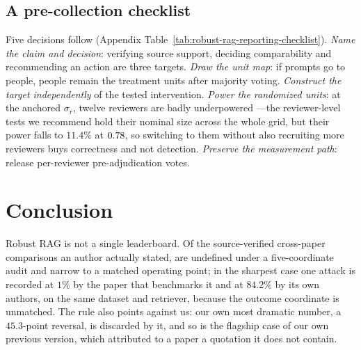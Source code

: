 \documentclass[11pt]{article}
\begin{document}
\subsection{A pre-collection checklist}
\label{sec:practical-audit}

Five decisions follow (Appendix
Table~\ref{tab:robust-rag-reporting-checklist}). \emph{Name the claim and
decision}: verifying source support, deciding comparability and recommending an
action are three targets. \emph{Draw the unit map}: if prompts go to people,
people remain the treatment units after majority voting.
\emph{Construct the target independently} of the tested intervention.
\emph{Power the randomized units}: at the anchored $\sigma_r$, twelve reviewers
are badly underpowered \citep{card2020power}---the reviewer-level tests we
recommend hold their nominal size across the whole grid, but their power falls
to $11.4\%$ at $0.78$, so switching to them without also recruiting more
reviewers buys correctness and not detection. \emph{Preserve the measurement
path}: release per-reviewer pre-adjudication votes.

\section{Conclusion}

Robust RAG is not a single leaderboard. Of the \LedgerStated{} source-verified
cross-paper comparisons an author actually stated, \LedgerStatedUndef{} are
undefined under a five-coordinate audit and \LedgerStatedNarrow{} narrow to a
matched operating point; in the sharpest case one attack is recorded at $1\%$
by the paper that benchmarks it and at $84.2\%$ by its own authors, on the same
dataset and retriever, because the outcome coordinate is unmatched. The rule
also points against us: our own most
dramatic number, a $45.3$-point reversal, is discarded by it, and so is the
flagship case of our own previous version, which attributed to a paper a
quotation it does not contain.
\end{document}
